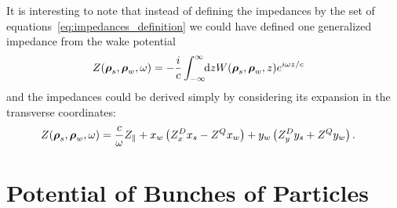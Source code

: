     It is interesting to note that instead of defining the impedances by the set of equations~\eqref{eq:impedances_definition} we could have defined one generalized impedance from the wake potential
    \begin{align}\label{eq:generalized_impedance_definition}
            Z(\boldsymbol{\rho}_s, \boldsymbol{\rho}_w, \omega) &= -\frac{i}{c} \int_{-\infty}^{\infty}\!\!\text{d}z W(\boldsymbol{\rho}_s, \boldsymbol{\rho}_w, z)e^{i\omega z/c}
    \end{align}
    and the impedances could be derived simply by considering its expansion in the transverse coordinates:
    \begin{align}
        Z(\boldsymbol{\rho}_s, \boldsymbol{\rho}_w, \omega) &=
	  		\frac{c}{\omega}Z_\parallel +
			x_w\left(Z^D_xx_s - Z^Qx_w\right) +
			y_w\left(Z^D_yy_s + Z^Qy_w\right).
    \end{align}

\section{Potential of Bunches of Particles}\label{sec:potential_of_bunch}

